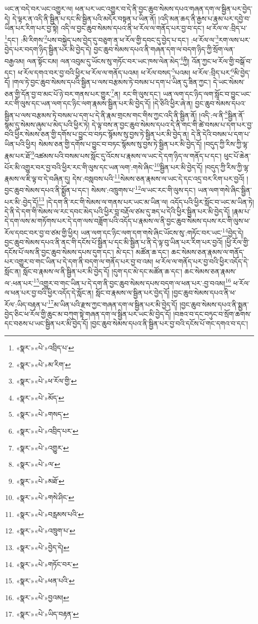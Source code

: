 ཡང་ན་བདེ་བར་ཡང་འགྱུར་ལ། ཕན་པར་ཡང་འགྱུར་བ་དེ་ནི་བྱང་ཆུབ་སེམས་དཔའ་གཞན་དག་ལ་སྦྱིན་པར་བྱེད་དེ། དེ་ལྟར་ན་འདི་ནི་སྦྱིན་པ་དང་མི་སྦྱིན་པའི་མདོར་བསྟན་པ་ཡིན་ནོ། །འདི་མན་ཆད་ནི་རྒྱས་པ་རྣམ་པར་དབྱེ་བ་ཡིན་པར་རིག་པར་བྱ་སྟེ། འདི་ལ་བྱང་ཆུབ་སེམས་དཔའ་ནི་ཕ་རོལ་ལ་གནོད་པར་བྱ་བ་དང་། ཕ་རོལ་ལ་:བྲིད་པ་\footnote{«སྣར་»«པེ་»འབྲིད་པ་}དང་། :མི་རིགས་\footnote{«སྣར་»«པེ་»མ་རིག་}པས་བསྐྱེད་པས་བྱེད་དུ་བཅུག་ན་ཕ་རོལ་གྱི་དབང་དུ་བྱེད་པ་དང་། :ཕ་རོལ་ལ་\footnote{«སྣར་»«པེ་»ཕ་རོལ་གྱི་}རག་ལས་པར་བྱེད་པར་བདག་ཉིད་སྦྱིན་པར་མི་བྱེད་དེ། བྱང་ཆུབ་སེམས་དཔའ་ནི་གཞན་དག་ལ་བདག་ཉིད་ཀྱི་སྲོག་ལན་བརྒྱའམ། ལན་སྟོང་ངམ། ལན་འབུམ་དུ་ཡོངས་སུ་གཏོང་བར་ཡང་ཁས་ལེན་མེད་\footnote{«སྣར་»«པེ་»མོད་}ཀྱི། འོན་ཀྱང་ཕ་རོལ་གྱི་བསྒོ་བ་དང་། ཕ་རོལ་དགའ་བར་བྱ་བའི་ཕྱིར་ཕ་རོལ་ལ་གནོད་པའམ། ཕ་རོལ་བསད་\footnote{«སྣར་»«པེ་»གསད་}པའམ། ཕ་རོལ་:བྲིད་པར་\footnote{«སྣར་»«པེ་»འབྲིད་པར་}མི་བྱེད་དོ། །གལ་ཏེ་བྱང་ཆུབ་སེམས་དཔའི་སྦྱིན་པ་ལས་བརྩམས་ཏེ་བསམ་པ་དག་པ་ཡིན་དུ་ཟིན་ཀྱང་། དེ་ཡང་སེམས་ཅན་གྱི་དོན་བྱ་བ་མང་པོ་ཉེ་བར་གནས་པར་གྱུར་\footnote{«སྣར་»«པེ་»འགྱུར་}ན། རང་གི་ལུས་དང་། ཡན་ལག་དང་ཉིད་ལག་སློང་བ་བྱུང་ཡང་རང་གི་ལུས་དང་ཡན་ལག་དང་ཉིང་ལག་རྣམས་སྦྱིན་པར་མི་བྱེད་དོ། །དེ་ཅིའི་ཕྱིར་ཞེ་ན། བྱང་ཆུབ་སེམས་དཔའ་སྦྱིན་པ་ལས་བརྩམས་ཏེ་བསམ་པ་དག་པ་དེ་ནི་རྣམ་གྲངས་གང་གིས་ཀྱང་འདི་ནི་སྦྱིན་ནོ། །འདི་:ལ་ནི་\footnote{«སྣར་»«པེ་»ལ་}སྦྱིན་ནོ་སྙམ་དུ་སེམས་ཞུམ་པ་མེད་པའི་ཕྱིར་ཏེ། དེ་ལྟ་བས་ན་བྱང་ཆུབ་སེམས་དཔའ་དེ་ནི་གང་གི་ཚེ་བསམ་པ་དག་པར་བྱ་བའི་ཕྱིར་སེམས་ཅན་གྱི་དགོས་པ་བྱུང་བ་བཏང་སྙོམས་སུ་བྱས་ཏེ་སྦྱིན་པར་མི་བྱེད་ན། དེ་ནི་དེའི་བསམ་པ་དག་པ་ཡིན་པའི་ཕྱིར། སེམས་ཅན་གྱི་དགོས་པ་བྱུང་བ་བཏང་སྙོམས་སུ་བྱས་ཏེ་སྦྱིན་པར་མི་བྱེད་དོ། །བདུད་ཀྱི་རིས་ཀྱི་ལྷ་རྣམ་པར་ཐོ་\footnote{«སྣར་»«པེ་»མཐོ་}འཚམས་པའི་བསམ་པས་སློང་དུ་འོངས་པ་རྣམས་ལ་ཡང་དེ་དག་ཉིད་ལ་གནོད་པ་དང་། ཕུང་པོ་ཆེན་པོར་མི་འགྱུར་བར་བྱ་བའི་ཕྱིར་རང་གི་ལུས་དང་ཡན་ལག་:གསེ་ཞིང་\footnote{«སྣར་»«པེ་»གསེ་ཤིང་}སྦྱིན་པར་མི་བྱེད་དོ། །བདུད་ཀྱི་རིས་ཀྱི་ལྷ་རྣམས་ལ་ཇི་ལྟ་བ་དེ་བཞིན་དུ། དེས་:བསླབས་པའི་\footnote{«སྣར་»«པེ་»བརླམས་པའི་}སེམས་ཅན་རྣམས་ལ་ཡང་དེ་དང་འདྲ་བར་རིག་པར་བྱའོ། །བྱང་ཆུབ་སེམས་དཔའ་ནི་སྨྱོན་པ་དང་། སེམས་:འཁྲུགས་པ་\footnote{«སྣར་»«པེ་»འཁྲུག་པ་}ལ་ཡང་རང་གི་ལུས་དང་། ཡན་ལག་གསེ་ཞིང་སྦྱིན་པར་མི་:བྱེད་དོ།\footnote{«སྣར་»«པེ་»བྱེད་དེ།} །དེ་དག་ནི་རང་གི་སེམས་ལ་གནས་པར་ཡང་མ་ཡིན་ལ། འདོད་པའི་ཕྱིར་སློང་བ་ཡང་མ་ཡིན་ཏེ། དེ་ནི་དེ་དག་གི་སེམས་ལ་རང་དབང་མེད་པའི་ཕྱིར་བླ་བརྡོལ་ཙམ་དུ་ཟད་པ་དེའི་ཕྱིར་སྦྱིན་པར་མི་བྱེད་དོ། །རྣམ་པ་དེ་དག་ལས་མ་གཏོགས་པར་དེ་དག་ལས་བཟློག་པའི་འདོད་པ་རྣམས་ལ་ནི་བྱང་ཆུབ་སེམས་དཔས་རང་གི་ལུས་ཕ་རོལ་དབང་བར་བྱ་བ་ཙམ་གྱི་ཕྱིར། ཡན་ལག་དང་ཉིང་ལག་དག་གསེ་ཞིང་ཡོངས་སུ་:གཏོང་བར་ཡང་\footnote{«སྣར་»«པེ་»གཏོང་བར་}བྱེད་དེ། བྱང་ཆུབ་སེམས་དཔའ་ནི་ནང་གི་དངོས་པོ་སྦྱིན་པ་དང་མི་སྦྱིན་པ་ནི་དེ་ལྟ་བུ་ཡིན་པར་རིག་པར་བྱའོ། །ཕྱི་རོལ་གྱི་དངོས་པོ་ལས་ནི་བྱང་ཆུབ་སེམས་དཔས་དུག་དང་། མེ་དང་། མཚོན་ཆ་དང་། ཆང་སེམས་ཅན་རྣམས་ལ་གནོད་པར་འགྱུར་བ་གང་ཡིན་པ་དེ་དག་ནི་བདག་ལ་གནོད་པར་བྱ་བ་འམ། ཕ་རོལ་ལ་གནོད་པར་བྱ་བའི་ཕྱིར་འདོད་དེ་སློང་ན། སློང་བ་རྣམས་ལ་ནི་སྦྱིན་པར་མི་བྱེད་དོ། །དུག་དང་མེ་དང་མཚོན་ཆ་དང་། ཆང་སེམས་ཅན་རྣམས་ལ་:ཕན་པར་\footnote{«སྣར་»«པེ་»ཕན་པའི་}འགྱུར་བ་གང་ཡིན་པ་དེ་དག་ནི་བྱང་ཆུབ་སེམས་དཔས་བདག་ལ་ཕན་པར་:བྱ་བའམ།\footnote{«སྣར་»«པེ་»བྱའམ།} ཕ་རོལ་ལ་ཕན་པར་བྱ་བའི་ཕྱིར་འདོད་དེ་སློང་ན། སློང་བ་རྣམས་ལ་སྦྱིན་པར་བྱེད་དོ། །བྱང་ཆུབ་སེམས་དཔའ་ནི་ཕ་རོལ་:ཡིད་བརྟན་པ་\footnote{«སྣར་»«པེ་»ཡིད་བརྟན་}མ་ཡིན་པའི་རྫས་ཀྱང་གཞན་དག་ལ་སྦྱིན་པར་མི་བྱེད་དོ། །བྱང་ཆུབ་སེམས་དཔའ་ནི་སྨྱན་བྱེད་ཅིང་ཕ་རོལ་གྱི་ཆུང་མ་བཀུག་སྟེ་གཞན་དག་ལ་སྦྱིན་པར་ཡང་མི་བྱེད་དོ། །བཟའ་བ་དང་བཏུང་བ་སྲོག་ཆགས་དང་བཅས་པ་ཡང་སྦྱིན་པར་མི་བྱེད་དོ། །བྱང་ཆུབ་སེམས་དཔའ་ནི་སྦྱིན་པར་བྱ་བའི་དངོས་པོ་གང་དགའ་བ་དང་། 
